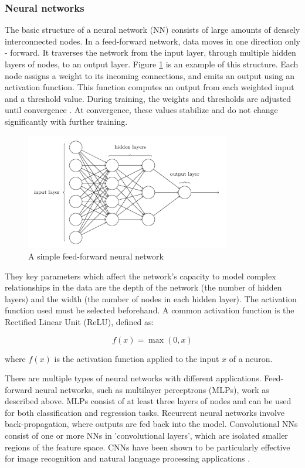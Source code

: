 \clearpage

\subsubsection{Neural networks}

The basic structure of a neural network (NN) consists of large amounts of densely interconnected nodes. In a feed-forward network, data moves in one direction only - forward. It traverses the network from the input layer, through multiple hidden layers of nodes, to an output layer. Figure \ref{fig:feedforward} is an example of this structure. Each node assigns a weight to its incoming connections, and emits an output using an activation function. This function computes an output from each weighted input and a threshold value. During training, the weights and thresholds are adjusted until convergence \cite{nnoverview}. At convergence, these values stabilize and do not change significantly with further training.

\begin{figure}[h]
	\centering
	\includegraphics[width=0.8\textwidth]{Figures/feedforward.png}
	\caption{A simple feed-forward neural network \cite{nn_fig}}
	\label{fig:feedforward}
\end{figure}

They key parameters which affect the network's capacity to model complex relationships in the data are the depth of the network (the number of hidden layers) and the width (the number of nodes in each hidden layer). The activation function used must be selected beforehand. A common activation function is the Rectified Linear Unit (ReLU), defined as:

\[ f(x) = \max(0, x) \]

where \( f(x) \) is the activation function applied to the input \( x \) of a neuron.

There are multiple types of neural networks with different applications. Feed-forward neural networks, such as multilayer perceptrons (MLPs), work as described above. MLPs consist of at least three layers of nodes and can be used for both classification and regression tasks. Recurrent neural networks involve back-propagation, where outputs are fed back into the model. Convolutional NNs consist of one or more NNs in 'convolutional layers', which are isolated smaller regions of the feature space. CNNs have been shown to be particularly effective for image recognition and natural language processing applications \cite{cnn-paper}. 

